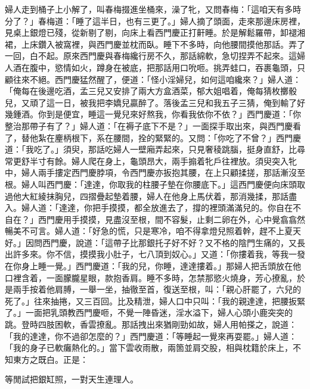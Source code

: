 婦人走到桶子上小解了，叫春梅掇進坐桶來，澡了牝，又問春梅：「這咱天有多時分了？」春梅道：「睡了這半日，也有三更了。」婦人摘了頭面，走來那邊床房裡，見桌上銀燈已殘，從新剔了剔，向床上看西門慶正打鼾睡。於是解鬆羅帶，卸褪湘裙，上床鑽入被窩裡，與西門慶並枕而臥。睡下不多時，向他腰間摸他那話。弄了一回，白不起。原來西門慶與春梅纔行房不久，那話綿軟，急切捏弄不起來。這婦人酒在腹中，慾情如火，蹲身在被底，把那話用口吮咂。挑弄蛙口，吞裹龜頭，只顧往來不絕。西門慶猛然醒了，便道：「怪小淫婦兒，如何這咱纔來？」婦人道：「俺每在後邊吃酒，孟三兒又安排了兩大方盒酒菜，郁大姐唱着，俺每猜枚擲骰兒，又頑了這一日，被我把李嬌兒贏醉了。落後孟三兒和我五子三猜，俺到輸了好幾鍾酒。你到是便宜，睡這一覺兒來好熬我，你看我依你不依？」{}西門慶道：「你整治那帶子有了？」婦人道：「在褥子底下不是？」一面探手取出來，與西門慶看了，替他紮在麈柄根下，系在腰間，拴的緊緊的。又問：「你吃了不曾？」西門慶道：「我吃了。」須臾，那話吃婦人一壁廂弄起來，{}只見奢稜跳腦，挺身直舒，比尋常更舒半寸有餘。婦人爬在身上，龜頭昂大，兩手搧着牝戶往裡放。須臾突入牝中，婦人兩手摟定西門慶脖項，令西門慶亦扳抱其腰，在上只顧揉搓，那話漸沒至根。婦人叫西門慶：「達達，你取我的柱腰子墊在你腰底下。」這西門慶便向床頭取過他大紅綾抹胸兒，四摺疊起墊着腰，婦人在他身上馬伏着，那消幾揉，那話盡入。婦人道：「達達，你把手摸摸，都全放進去了，撐的裡頭滿滿兒的。你自在不自在？」西門慶用手摸摸，見盡沒至根，間不容髮，止剩二卵在外，心中覺翕翕然暢美不可言。婦人道：「好急的慌，只是寒冷，咱不得拿燈兒照着幹，趕不上夏天好。」因問西門慶，說道：「這帶子比那銀托子好不好？又不格的陰門生痛的，又長出許多來。你不信，摸摸我小肚子，七八頂到奴心。」又道：「你摟着我，等我一發在你身上睡一覺。」西門慶道：「我的兒，你睡，達達摟着。」那婦人把舌頭放在他口裡含着，一面朦朧星眼，款抱香肩。睡不多時，怎禁那慾火燒身，芳心撩亂，於是兩手按着他肩膊，一舉一坐，抽徹至首，復送至根，叫：「親心肝罷了，六兒的死了。」往來抽捲，又三百回。比及精泄，婦人口中只叫：「我的親達達，把腰扳緊了。」一面把乳頭教西門慶咂，不覺一陣昏迷，淫水溢下，婦人心頭小鹿突突的跳。登時四肢困軟，香雲撩亂。那話拽出來猶剛勁如故，婦人用帕搽之，說道：「我的達達，你不過卻怎麼的？」西門慶道：「等睡起一覺來再耍罷。」婦人道：「我的身子已軟癱熱化的。」{}當下雲收雨散，兩箇並肩交股，相與枕籍於床上，不知東方之既白。正是：

\begin{myquote}
等閒試把銀缸照，一對天生連理人。
\end{myquote}


